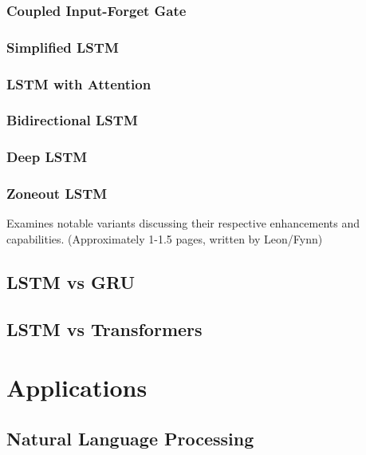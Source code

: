 \documentclass[twoside,a4paper,10pt,DIV=12,BCOR=12mm]{scrartcl}
\begin{document}
 \subsubsection{Coupled Input-Forget Gate}

\subsubsection{Simplified LSTM}

\subsubsection{LSTM with Attention}

\subsubsection{Bidirectional LSTM}

\subsubsection{Deep LSTM}

\subsubsection{Zoneout LSTM}

Examines notable variants discussing their respective enhancements and capabilities.
(Approximately 1-1.5 pages, written by Leon/Fynn)

\subsection{LSTM vs GRU}

\subsection{LSTM vs Transformers}

\section{Applications}

\subsection{Natural Language Processing}
\end{document}
